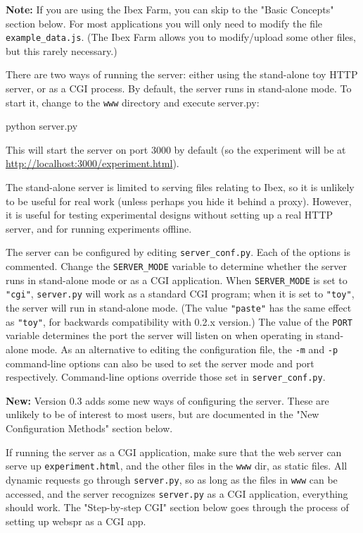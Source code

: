 \documentclass[
]{article}
\newenvironment{Shaded}{}{}
\newcommand{\ExtensionTok}[1]{#1}
\newcommand{\NormalTok}[1]{#1}
\begin{document}
\textbf{Note:} If you are using the Ibex Farm, you can skip to the
"Basic Concepts" section below. For most applications you will only need
to modify the file \texttt{example\_data.js}. (The Ibex Farm allows you
to modify/upload some other files, but this rarely necessary.)

There are two ways of running the server: either using the stand-alone
toy HTTP server, or as a CGI process. By default, the server runs in
stand-alone mode. To start it, change to the \texttt{www} directory and
execute server.py:

\begin{Shaded}
\begin{Highlighting}[]
    \ExtensionTok{python}\NormalTok{ server.py}
\end{Highlighting}
\end{Shaded}

This will start the server on port 3000 by default (so the experiment
will be at \url{http://localhost:3000/experiment.html}).

The stand-alone server is limited to serving files relating to Ibex, so
it is unlikely to be useful for real work (unless perhaps you hide it
behind a proxy). However, it is useful for testing experimental designs
without setting up a real HTTP server, and for running experiments
offline.

The server can be configured by editing \texttt{server\_conf.py}. Each
of the options is commented. Change the \texttt{SERVER\_MODE} variable
to determine whether the server runs in stand-alone mode or as a CGI
application. When \texttt{SERVER\_MODE} is set to \texttt{"cgi"},
\texttt{server.py} will work as a standard CGI program; when it is set
to \texttt{"toy"}, the server will run in stand-alone mode. (The value
\texttt{"paste"} has the same effect as \texttt{"toy"}, for backwards
compatibility with 0.2.x version.) The value of the \texttt{PORT}
variable determines the port the server will listen on when operating in
stand-alone mode. As an alternative to editing the configuration file,
the \texttt{-m} and \texttt{-p} command-line options can also be used to
set the server mode and port respectively. Command-line options override
those set in \texttt{server\_conf.py}.

\textbf{New:} Version 0.3 adds some new ways of configuring the server.
These are unlikely to be of interest to most users, but are documented
in the "New Configuration Methods" section below.

If running the server as a CGI application, make sure that the web
server can serve up \texttt{experiment.html}, and the other files in the
\texttt{www} dir, as static files. All dynamic requests go through
\texttt{server.py}, so as long as the files in \texttt{www} can be
accessed, and the server recognizes \texttt{server.py} as a CGI
application, everything should work. The "Step-by-step CGI" section
below goes through the process of setting up webspr as a CGI app.
\end{document}
